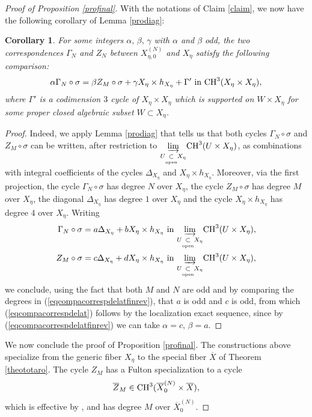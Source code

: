 \documentclass[10pt]{article}
\newtheorem{coro}[theo]{Corollary}
\begin{document}
\begin{proof}[Proof of Proposition \ref{profinal}]
  With the notations of Claim \ref{claim}, we now have the following corollary of Lemma \ref{prodiag}:
\begin{coro}\label{eqpourrestdiagcomp}  For   some  integers $\alpha,\,\beta,\,\gamma$ with $\alpha$ and $\beta$ odd, the two correspondences $\Gamma_N$ and $Z_N$ between $X_{\eta,0}^{(N)}$ and $X_{\eta}$ satisfy the following comparison:
\begin{eqnarray}\label{eqcompacorrespdelat} \alpha \Gamma_N\circ \sigma=\beta {Z}_{M}\circ \sigma +\gamma X_{\eta}\times h_{X_{\eta}}+ \Gamma'\,\,{\rm in}\,\,{\rm CH}^3(X_{\eta}\times X_{\eta}),
\end{eqnarray}
where $\Gamma'$ is a   codimension $3$ cycle  of $X_{\eta}\times X_{\eta}$ which is supported on  $W\times X_{\eta}$ for some proper closed algebraic subset $W\subset X_{\eta}$.
\end{coro}
\begin{proof} Indeed, we apply Lemma \ref{prodiag} that tells us that both cycles
 $\Gamma_N\circ \sigma$ and ${Z}_{M}\circ \sigma$ can be written, after restriction to $\underset{{U}\underset{{\rm open}}{\subset} X_{\eta}}{\underrightarrow{\rm lim}}{\rm CH}^3(U\times X_{\eta})$,  as combinations with integral coefficients of the cycles $\Delta_{X_{\eta}}$ and $X_{\eta}\times h_{X_{\eta}}$. Moreover, via the first projection, the cycle  $\Gamma_N\circ \sigma$ has degree $N$ over $X_{\eta}$,  the cycle  ${Z}_{M}\circ \sigma$ has degree $M$ over $X_{\eta}$, the diagonal $\Delta_{X_{\eta}}$ has degree $1$ over $X_{\eta}$ and the cycle $X_{\eta}\times h_{X_{\eta}}$ has degree $4$ over $X_{\eta}$. Writing
 \begin{eqnarray}\label{eqcompacorrespdelatfinrev}\Gamma_N\circ \sigma=a\Delta_{X_{\eta}}+bX_{\eta}\times h_{X_{\eta}}\,\,{\rm in}\,\,\underset{{U}\underset{{\rm open}}{\subset} X_{\eta}}{\underrightarrow{\rm lim}}{\rm CH}^3(U\times X_{\eta}),\\
 \nonumber
 Z_M\circ \sigma=c\Delta_{X_{\eta}}+dX_{\eta}\times h_{X_{\eta}}\,\,{\rm in}\,\,\underset{{U}\underset{{\rm open}}{\subset} X_{\eta}}{\underrightarrow{\rm lim}}{\rm CH}^3(U\times X_{\eta}),\end{eqnarray}
 we conclude, using the fact that both $M$ and $N$ are odd and by comparing the degrees in (\ref{eqcompacorrespdelatfinrev}), that $a$ is odd and $c$ is odd, from which (\ref{eqcompacorrespdelat}) follows by the localization exact sequence, since by (\ref{eqcompacorrespdelatfinrev}) we can take $\alpha=c,\,\beta=a$.
\end{proof}
We now conclude the proof of Proposition \ref{profinal}. The constructions above specialize from the generic fiber $X_{\eta}$ to the special fiber $\overline{X}$ of Theorem \ref{theototaro}.
The cycle ${Z}_M$ has a Fulton specialization to a cycle $$\overline{Z}_M\in {\rm CH}^3(\overline{X}^{(N)}_0\times \overline{X}),$$
which is effective by \cite[Lemme 2.10]{colliot}, and has degree $M$ over $\overline{X}^{(N)}_0$.


\end{proof}
\end{document}
